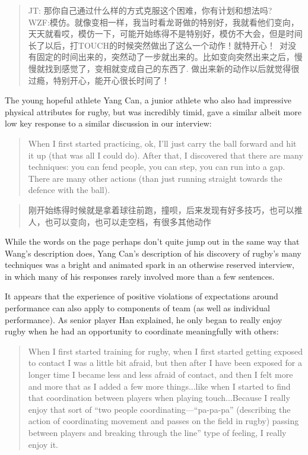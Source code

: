 \begin{CJK}{UTF8}{gbsn}
    \begin{quotation}
      JT: 那你自己通过什么样的方式克服这个困难，你有计划和想法吗? \\
      WZF:模仿。就像变相一样，我当时看龙哥做的特别好，我就看他们变向，天天就看哎，模仿一下，可能开始练得不是特别好，模仿不大会，但是时间长了以后，打TOUCH的时候突然做出了这么一个动作！就特开心！ 对没有固定的时间出来的，突然动了一步就出来的。比如变向突然出来之后，慢慢就找到感觉了，变相就变成自己的东西了. 做出来新的动作以后就觉得很过瘾，特别开心，能开心很长时间了！
    \end{quotation}

The young hopeful athlete Yang Can, a junior athlete who also had impressive physical attributes for rugby, but was incredibly timid, gave a similar albeit more low key response to a similar discussion in our interview:

    \begin{quotation}
      When I first started practicing, ok, I’ll just carry the ball forward and hit it up (that was all I could do). After that, I discovered that there are many techniques: you can fend people, you can step, you can run into a gap. There are many other actions (than just running straight towards the defence with the ball).
    \end{quotation}

    \begin{quotation}
      刚开始练得时候就是拿着球往前跑，撞呗，后来发现有好多技巧，也可以推人，也可以变向，也可以走空档，有很多其他动作 
    \end{quotation}

While the words on the page perhaps don't quite jump out in the same way that Wang's description does, Yang Can's description of his discovery of rugby's many techniques was a bright and animated spark in an otherwise reserved interview, in which many of his responses rarely involved more than a few sentences.

It appears that the experience of positive violations of expectations around performance can also apply to components of team (as well as individual performance).  As senior player Han explained, he only began to really enjoy rugby when he had an opportunity to coordinate meaningfully with others:

\begin{quotation}
    When I first started training for rugby, when I first started getting exposed to contact I was a little bit afraid, but then after I have been exposed for a longer time I became less and less afraid of contact, and then I felt more and more that as I added a few more things...like when I started to find that coordination between players when playing touch...Because I really enjoy that sort of ``two people coordinating---``pa-pa-pa'' (describing the action of coordinating movement and passes on the field in rugby) passing between players and breaking through the line'' type of feeling, I really enjoy it.
\end{quotation}


\end{CJK}
